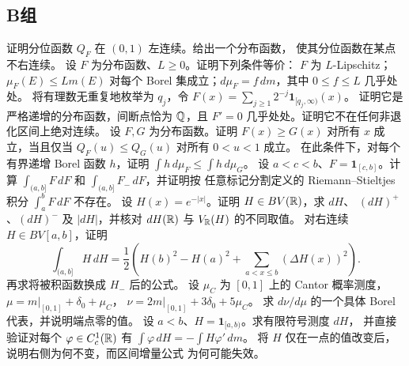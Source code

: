 \subsection*{B组}
\begin{enumerate}[label=\textbf{\thechapter.\arabic*.},resume]
证明分位函数 \(Q_F\) 在 \((0,1)\) 左连续。给出一个分布函数，
使其分位函数在某点不右连续。
设 \(F\) 为分布函数、\(L\ge0\)。证明下列条件等价：
\(F\) 为 \(L\)-Lipschitz；\(\mu_F(E)\le Lm(E)\) 对每个 Borel
集成立；\(d\mu_F=f\,dm\)，其中 \(0\le f\le L\) 几乎处处。
将有理数无重复地枚举为 \(q_j\)，令
\(F(x)=\sum_{j\ge1}2^{-j}\mathbf1_{[q_j,\infty)}(x)\)。
证明它是严格递增的分布函数，间断点恰为 \(\mathbb{Q}\)，且 \(F'=0\)
几乎处处。证明它不在任何非退化区间上绝对连续。
设 \(F,G\) 为分布函数。证明
\(F(x)\ge G(x)\) 对所有 \(x\) 成立，当且仅当
\(Q_F(u)\le Q_G(u)\) 对所有 \(0<u<1\) 成立。
在此条件下，对每个有界递增 Borel 函数 \(h\)，证明
\(\int h\,d\mu_F\le\int h\,d\mu_G\)。
设 \(a<c<b\)、\(F=\mathbf1_{[c,b]}\)。计算
\(\int_{(a,b]}F\,dF\) 和 \(\int_{(a,b]}F_-\,dF\)，并证明按
任意标记分割定义的 Riemann--Stieltjes 积分 \(\int_a^bF\,dF\)
不存在。
设 \(H(x)=e^{-|x|}\)。证明 \(H\in BV(\mathbb{R})\)，求 \(dH\)、
\((dH)^+\)、\((dH)^-\) 及 \(|dH|\)，并核对
\(dH(\mathbb{R})\) 与 \(V_{\mathbb{R}}(H)\) 的不同取值。
对右连续 \(H\in BV[a,b]\)，证明
\[
 \int_{(a,b]}H\,dH
 =\frac12\left(H(b)^2-H(a)^2+
       \sum_{a<x\le b}(\Delta H(x))^2\right).
\]
再求将被积函数换成 \(H_-\) 后的公式。
设 \(\mu_C\) 为 \([0,1]\) 上的 Cantor 概率测度，
\(\mu=m|_{[0,1]}+\delta_0+\mu_C\)，
\(\nu=2m|_{[0,1]}+3\delta_0+5\mu_C\)。
求 \(d\nu/d\mu\) 的一个具体 Borel 代表，并说明端点零的值。
设 \(a<b\)、\(H=\mathbf1_{[a,b)}\)。求有限符号测度 \(dH\)，
并直接验证对每个 \(\varphi\in C_c^1(\mathbb{R})\) 有
\(\int\varphi\,dH=-\int H\varphi'\,dm\)。
将 \(H\) 仅在一点的值改变后，说明右侧为何不变，而区间增量公式
为何可能失效。
\end{enumerate}

